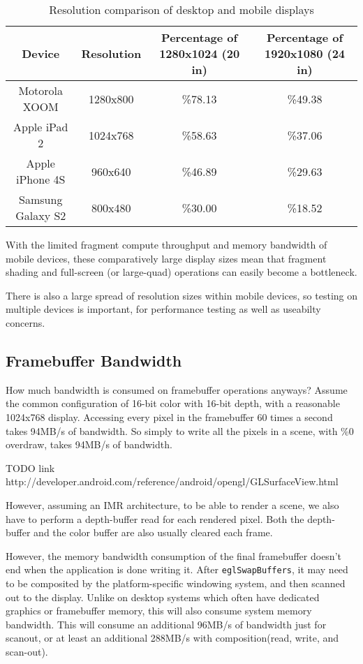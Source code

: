 \begin{table}[htb]\centering
\begin{tabular}{|c|c|c|c|}
\hline%
\small{Device} & \small{Resolution} & \small{Percentage of 1280x1024 (20 in)} & \small{Percentage of 1920x1080 (24 in)}  \\
\hline%
\small{Motorola XOOM} & \small{1280x800} & \small{\%78.13} & \small{\%49.38}\\
\hline%
\small{Apple iPad 2} & \small{1024x768} & \small{\%58.63} & \small{\%37.06}\\
\hline%
\small{Apple iPhone 4S} & \small{960x640} & \small{\%46.89} & \small{\%29.63}\\
\hline%
\small{Samsung Galaxy S2} & \small{800x480} & \small{\%30.00} & \small{\%18.52}\\
\hline%
\end{tabular}
 \caption{Resolution comparison of desktop and mobile displays}
 \label{JonMcCaffrey:resolutions}
\end{table}

With the limited fragment compute throughput and memory bandwidth of mobile devices, these comparatively large display sizes mean that fragment shading and full-screen (or large-quad) operations can easily become a bottleneck.

There is also a large spread of resolution sizes within mobile devices, so testing on multiple devices is important, for performance testing as well as useabilty concerns.

\subsection{Framebuffer Bandwidth}

How much bandwidth is consumed on framebuffer operations anyways?  Assume the common configuration of 16-bit color with 16-bit depth, with a reasonable 1024x768 display.  Accessing every pixel in the framebuffer 60 times a second takes 94MB/s of bandwidth.  So simply to write all the pixels in a scene, with \%0 overdraw, takes 94MB/s of bandwidth.

TODO link http://developer.android.com/reference/android/opengl/GLSurfaceView.html

However, assuming an IMR architecture, to be able to render a scene, we also have to perform a depth-buffer read for each rendered pixel.  Both the depth-buffer and the color buffer are also usually cleared each frame.  

However, the memory bandwidth consumption of the final framebuffer doesn't end when the application is done writing it.  After \texttt{eglSwapBuffers}, it may need to be composited by the platform-specific windowing system, and then scanned out to the display.  Unlike on desktop systems which often have dedicated graphics or framebuffer memory, this will also consume system memory bandwidth.  This will consume an additional 96MB/s of bandwidth just for scanout, or at least an additional 288MB/s with composition(read, write, and scan-out).


